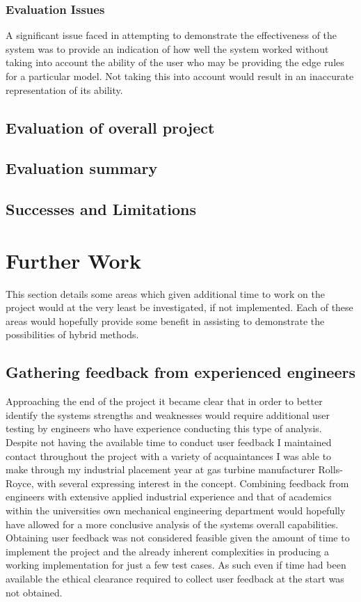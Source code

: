 \documentclass{article}
\begin{document}
\subsubsection{Evaluation Issues}
A significant issue faced in attempting to demonstrate the effectiveness of the system was to provide an indication of how well the system worked without taking into account the ability of the user who may be providing the edge rules for a particular model. Not taking this into account would result in an inaccurate representation of its ability.

\subsection{Evaluation of overall project}

% 


\subsection{Evaluation summary}

\subsection{Successes and Limitations}


\section{Further Work}
This section details some areas which given additional time to work on the project would at the very least be investigated, if not implemented. Each of these areas would hopefully provide some benefit in assisting to demonstrate the possibilities of hybrid methods.

\subsection{Gathering feedback from experienced engineers}
Approaching the end of the project it became clear that in order to better identify the systems strengths and weaknesses would require additional user testing by engineers who have experience conducting this type of analysis. Despite not having the available time to conduct user feedback I maintained contact throughout the project with a variety of acquaintances I was able to make through my industrial placement year at gas turbine manufacturer Rolls-Royce, with several expressing interest in the concept. Combining feedback from engineers with extensive applied industrial experience and that of academics within the universities own mechanical engineering department would hopefully have allowed for a more conclusive analysis of the systems overall capabilities. Obtaining user feedback was not considered feasible given the amount of time to implement the project and the already inherent complexities in producing a working implementation for just a few test cases. As such even if time had been available the ethical clearance required to collect user feedback at the start was not obtained.
\end{document}
